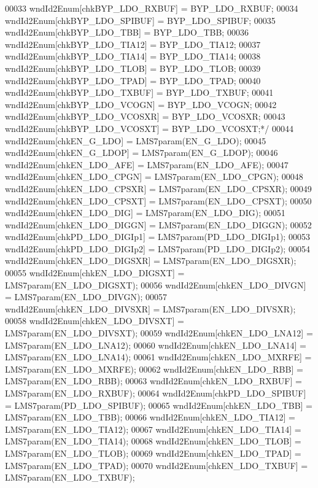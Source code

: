 \begin{DoxyCode}
00033 \textcolor{comment}{    wndId2Enum[chkBYP\_LDO\_RXBUF] = BYP\_LDO\_RXBUF;}
00034 \textcolor{comment}{    wndId2Enum[chkBYP\_LDO\_SPIBUF] = BYP\_LDO\_SPIBUF;}
00035 \textcolor{comment}{    wndId2Enum[chkBYP\_LDO\_TBB] = BYP\_LDO\_TBB;}
00036 \textcolor{comment}{    wndId2Enum[chkBYP\_LDO\_TIA12] = BYP\_LDO\_TIA12;}
00037 \textcolor{comment}{    wndId2Enum[chkBYP\_LDO\_TIA14] = BYP\_LDO\_TIA14;}
00038 \textcolor{comment}{    wndId2Enum[chkBYP\_LDO\_TLOB] = BYP\_LDO\_TLOB;}
00039 \textcolor{comment}{    wndId2Enum[chkBYP\_LDO\_TPAD] = BYP\_LDO\_TPAD;}
00040 \textcolor{comment}{    wndId2Enum[chkBYP\_LDO\_TXBUF] = BYP\_LDO\_TXBUF;}
00041 \textcolor{comment}{    wndId2Enum[chkBYP\_LDO\_VCOGN] = BYP\_LDO\_VCOGN;}
00042 \textcolor{comment}{    wndId2Enum[chkBYP\_LDO\_VCOSXR] = BYP\_LDO\_VCOSXR;}
00043 \textcolor{comment}{    wndId2Enum[chkBYP\_LDO\_VCOSXT] = BYP\_LDO\_VCOSXT;*/}
00044     wndId2Enum[chkEN_G_LDO] = LMS7param(EN_G_LDO);
00045     wndId2Enum[chkEN_G_LDOP] = LMS7param(EN_G_LDOP);
00046     wndId2Enum[chkEN_LDO_AFE] = LMS7param(EN_LDO_AFE);
00047     wndId2Enum[chkEN_LDO_CPGN] = LMS7param(EN_LDO_CPGN);
00048     wndId2Enum[chkEN_LDO_CPSXR] = LMS7param(EN_LDO_CPSXR);
00049     wndId2Enum[chkEN_LDO_CPSXT] = LMS7param(EN_LDO_CPSXT);
00050     wndId2Enum[chkEN_LDO_DIG] = LMS7param(EN_LDO_DIG);
00051     wndId2Enum[chkEN_LDO_DIGGN] = LMS7param(EN_LDO_DIGGN);
00052     wndId2Enum[chkPD_LDO_DIGIp1] = LMS7param(PD_LDO_DIGIp1);
00053     wndId2Enum[chkPD_LDO_DIGIp2] = LMS7param(PD_LDO_DIGIp2);
00054     wndId2Enum[chkEN_LDO_DIGSXR] = LMS7param(EN_LDO_DIGSXR);
00055     wndId2Enum[chkEN_LDO_DIGSXT] = LMS7param(EN_LDO_DIGSXT);
00056     wndId2Enum[chkEN_LDO_DIVGN] = LMS7param(EN_LDO_DIVGN);
00057     wndId2Enum[chkEN_LDO_DIVSXR] = LMS7param(EN_LDO_DIVSXR);
00058     wndId2Enum[chkEN_LDO_DIVSXT] = LMS7param(EN_LDO_DIVSXT);
00059     wndId2Enum[chkEN_LDO_LNA12] = LMS7param(EN_LDO_LNA12);
00060     wndId2Enum[chkEN_LDO_LNA14] = LMS7param(EN_LDO_LNA14);
00061     wndId2Enum[chkEN_LDO_MXRFE] = LMS7param(EN_LDO_MXRFE);
00062     wndId2Enum[chkEN_LDO_RBB] = LMS7param(EN_LDO_RBB);
00063     wndId2Enum[chkEN_LDO_RXBUF] = LMS7param(EN_LDO_RXBUF);
00064     wndId2Enum[chkPD_LDO_SPIBUF] = LMS7param(PD_LDO_SPIBUF);
00065     wndId2Enum[chkEN_LDO_TBB] = LMS7param(EN_LDO_TBB);
00066     wndId2Enum[chkEN_LDO_TIA12] = LMS7param(EN_LDO_TIA12);
00067     wndId2Enum[chkEN_LDO_TIA14] = LMS7param(EN_LDO_TIA14);
00068     wndId2Enum[chkEN_LDO_TLOB] = LMS7param(EN_LDO_TLOB);
00069     wndId2Enum[chkEN_LDO_TPAD] = LMS7param(EN_LDO_TPAD);
00070     wndId2Enum[chkEN_LDO_TXBUF] = LMS7param(EN_LDO_TXBUF);

\end{DoxyCode}
